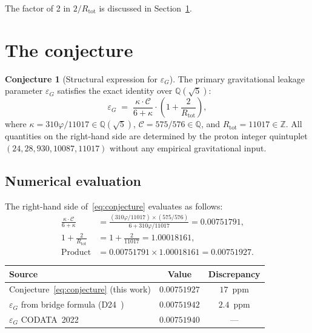 \documentclass[11pt,a4paper]{article}
\theoremstyle{definition}
\newtheorem{conjecture}[theorem]{Conjecture}
\newcommand{\Rtot}{R_{\mathrm{tot}}}
\newcommand{\epsg}{\varepsilon_G}
\newcommand{\calC}{\mathcal{C}}
\newcommand{\vp}{\varphi}
\newcommand{\kap}{\kappa}
\begin{document}
The factor of 2 in $2/\Rtot$ is discussed in Section~\ref{sec:conjecture}.

\section{The conjecture}
\label{sec:conjecture}

\begin{conjecture}[Structural expression for $\epsg$]
\label{conj:eps_G}
The primary gravitational leakage parameter $\epsg$ satisfies the exact identity over $\mathbb{Q}(\sqrt{5})$:
\begin{equation}
\label{eq:conjecture}
\epsg \;=\; \frac{\kap\cdot\calC}{6+\kap}\cdot\left(1+\frac{2}{\Rtot}\right),
\end{equation}
where $\kap = 310\vp/11017 \in \mathbb{Q}(\sqrt{5})$, $\calC = 575/576 \in \mathbb{Q}$, and $\Rtot = 11017 \in \mathbb{Z}$. All quantities on the right-hand side are determined by the proton integer quintuplet $(24, 28, 930, 10087, 11017)$ without any empirical gravitational input.
\end{conjecture}

\subsection{Numerical evaluation}
\label{subsec:numerical}

The right-hand side of~\eqref{eq:conjecture} evaluates as follows:
\begin{align}
\frac{\kap\cdot\calC}{6+\kap} &= \frac{(310\vp/11017)\times(575/576)}{6 + 310\vp/11017} = 0.00751791, \label{eq:step1}\\
1 + \frac{2}{\Rtot} &= 1 + \frac{2}{11017} = 1.00018161, \label{eq:step2}\\
\text{Product} &= 0.00751791 \times 1.00018161 = 0.00751927. \label{eq:product}
\end{align}

\begin{center}
\begin{tabular}{lcc}
\toprule
Source & Value & Discrepancy \\
\midrule
Conjecture~\eqref{eq:conjecture} (this work) & $0.00751927$ & $17$~ppm \\
$\epsg$ from bridge formula (D24~\cite{Bridge_PDL_2026}) & $0.00751942$ & $2.4$~ppm \\
$\epsg$ CODATA~2022 & $0.00751940$ & --- \\
\bottomrule
\end{tabular}
\end{center}
\end{document}
